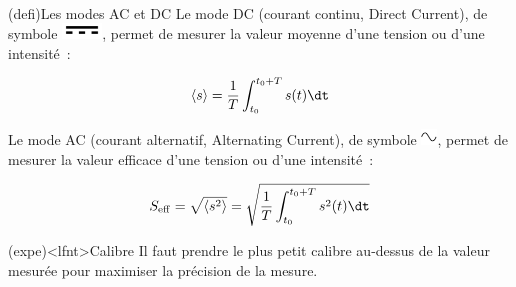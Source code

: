 \documentclass[../main/main.tex]{subfiles}
\begin{document}
\noindent
\begin{minipage}[t]{.7\linewidth}
	~
	\begin{tcb}(defi){Les modes AC et DC}
		Le mode DC (courant continu, Direct Current), de symbole
		\includegraphics[height=12pt]{dc}, permet de mesurer la valeur moyenne d'une
		tension ou d'une intensité~:

		\begin{equation*}
			\left\langle s \right\rangle = \frac{1}{T} \int_{t_0}^{t_0+T} s(t) \dt
		\end{equation*}

		Le mode AC (courant alternatif, Alternating Current), de symbole
		\includegraphics[height=12pt]{ac}, permet de mesurer la valeur efficace
		d'une tension ou d'une intensité~:

		\begin{equation*}
			S_{\rm eff} = \sqrt{ \left\langle s^2 \right\rangle} = \sqrt{\frac{1}{T}
				\int_{t_0}^{t_0+T} s^2(t) \dt}
		\end{equation*}
	\end{tcb}

	\begin{tcb}(expe)<lfnt>{Calibre}
		Il faut prendre le plus petit calibre au-dessus de la valeur mesurée pour
		maximiser la précision de la mesure.
	\end{tcb}
\end{minipage}
\hfill
\end{document}
